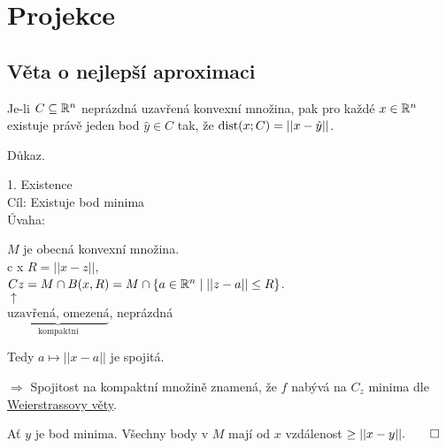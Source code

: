 \section{Projekce}

\subsection{Věta o nejlepší aproximaci}
Je-li $C \subseteq \mathbb{R}^n$ neprázdná uzavřená konvexní množina, pak pro každé $x \in \mathbb{R}^n$ existuje právě jeden bod 
$\hat y \in C$ tak, že $\operatorname*{dist} (x; C) = ||x-\hat y||$.

Důkaz.

1. Existence\\
Cíl: Existuje bod minima\\
Úvaha:
\begin{multicols}{2}


\columnbreak
    $M$ je obecná konvexní množina.\\c x
    $R = ||x-z||$,\\
    $Cz = M \cap B (x, R) = M \cap \left\lbrace a \in \mathbb{R}^n \mid ||z-a|| \leq R \right\rbrace$.\\
    $\uparrow$\\
    $\underbrace{\text{uzavřená, omezená}}_\text{kompaktní}$, neprázdná

    Tedy $a \mapsto ||x-a||$ je spojitá.

    $\Rightarrow$ Spojitost na kompaktní množině znamená, že $f$ nabývá na $C_z$ minima dle 
    \href{https://cs.wikipedia.org/wiki/Weierstrassova_v%C4%9Bta}{Weierstrassovy věty}.
\end{multicols}
Ať $y$ je bod minima. Všechny body v $M$ mají od $x$ vzdálenost $\geq ||x-y||. \qed$
\\

